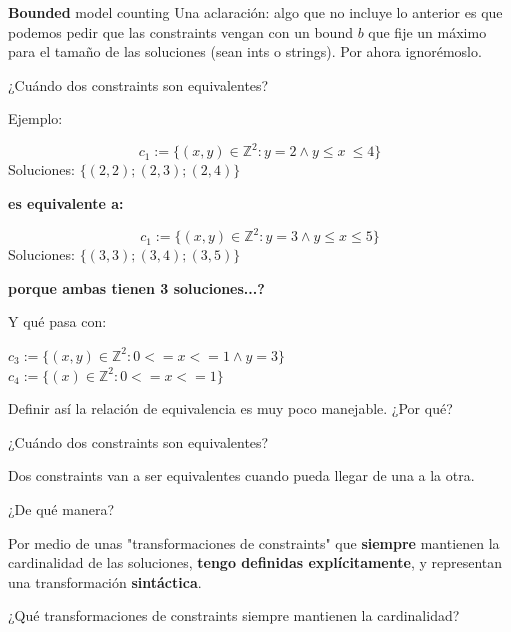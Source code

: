 \documentclass[10pt]{beamer}
\begin{document}
\begin{frame}{\textbf{Bounded} model counting}
Una aclaración: algo que no incluye lo anterior es que podemos pedir que las constraints vengan con un bound $b$ que fije un máximo para el tamaño de las soluciones (sean ints o strings). Por ahora ignorémoslo.




\end{frame}

\begin{frame}{¿Cuándo dos constraints son equivalentes?}


Ejemplo:

$$c_1 := \{(x,y) \in \mathbb{Z}^2 : y = 2 \land y \leq x\ \leq 4\}$$
Soluciones: $\{(2,2); (2,3) ; (2,4)\}$

\textbf{es equivalente a:}

$$c_1 := \{(x,y) \in \mathbb{Z}^2 : y = 3 \land y \leq x \leq 5\}$$
Soluciones: $\{(3,3); (3,4) ; (3,5)\}$


\textbf{porque ambas tienen 3 soluciones...?} \pause

Y qué pasa con:

$c_3 := \{(x,y) \in \mathbb{Z}^2 : 0<=x<=1 \land y = 3\}$\\$c_4 := \{(x) \in \mathbb{Z}^2 : 0<=x<=1\}$ \pause

Definir así la relación de equivalencia es muy poco manejable. ¿Por qué?
\end{frame}


\begin{frame}{¿Cuándo dos constraints son equivalentes?}

Dos constraints van a ser equivalentes cuando pueda llegar de una a la otra.

¿De qué manera?

Por medio de unas "transformaciones de constraints" que \textbf{siempre} mantienen la cardinalidad de las soluciones, \textbf{tengo definidas explícitamente}, y representan una transformación \textbf{sintáctica}.

¿Qué transformaciones de constraints siempre mantienen la cardinalidad?
\end{frame}
\end{document}

